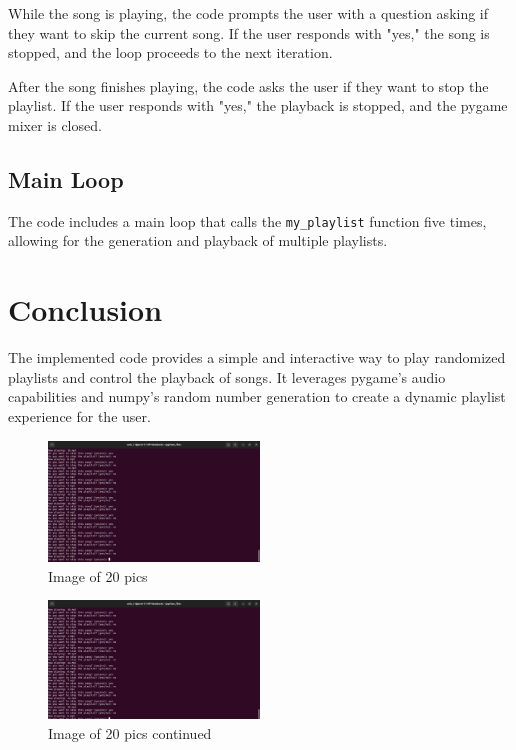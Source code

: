 \documentclass{article}
\begin{document}
While the song is playing, the code prompts the user with a question asking if they want to skip the current song. If the user responds with "yes," the song is stopped, and the loop proceeds to the next iteration.

After the song finishes playing, the code asks the user if they want to stop the playlist. If the user responds with "yes," the playback is stopped, and the pygame mixer is closed.

\subsection{Main Loop}
The code includes a main loop that calls the \texttt{my\_playlist} function five times, allowing for the generation and playback of multiple playlists.

\section{Conclusion}
The implemented code provides a simple and interactive way to play randomized playlists and control the playback of songs. It leverages pygame's audio capabilities and numpy's random number generation to create a dynamic playlist experience for the user.

\begin{figure}[h]
\centering
\includegraphics[width=0.5\textwidth]{figures/pic1.jpeg}
\caption{Image of 20 pics}
\label{fig:my_label}
\end{figure}
\begin{figure}
\centering
\includegraphics[width=0.5\textwidth]{figures/pic2.jpeg}
\caption{Image of 20 pics continued}
\label{fig:my_label}
\end{figure}
\end{document}
